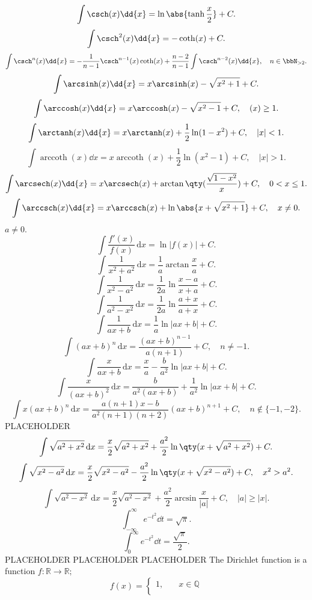 \documentclass[a4paper,12pt]{report}
\begin{document}
\begin{itemize}
\begin{itemize}
\[\int\csch(x)\dd{x}=\ln\abs{\tanh\frac{x}{2}}+C.\]
\[\int\csch^2(x)\dd{x}=-\coth(x)+C.\]
\[\int\csch^n(x)\dd{x}=-\frac{1}{n-1}\csch^{n-1}(x)\coth(x)+\frac{n-2}{n-1}\int\csch^{n-2}(x)\dd{x},\quad n\in\bbN_{>2}.\]
\[\int\arcsinh(x)\dd{x}=x\arcsinh(x)-\sqrt{x^2+1}+C.\]
\[\int\arccosh(x)\dd{x}=x\arccosh(x)-\sqrt{x^2-1}+C,\quad(x)\geq 1.\]
\[\int\arctanh(x)\dd{x}=x\arctanh(x)+\frac{1}{2}\ln(1-x^2)+C,\quad|x|<1.\]
\[\int\operatorname{arccoth}(x)\dd{x}=x\operatorname{arccoth}(x)+\frac{1}{2}\ln(x^2-1)+C,\quad|x|>1.\]
\[\int\arcsech(x)\dd{x}=x\arcsech(x)+\arctan\qty(\frac{\sqrt{1-x^2}}{x})+C,\quad 0<x\leq 1.\]
\[\int\arccsch(x)\dd{x}=x\arccsch(x)+\ln\abs{x+\sqrt{x^2+1}}+C,\quad x\neq 0.\]
$a\neq 0$.
\[\int\frac{f'(x)}{f(x)}\,\mathrm{d}x=\ln|f(x)|+C.\]
\[\int\frac{1}{x^2+a^2}\,\mathrm{d}x=\frac{1}{a}\arctan\frac{x}{a}+C.\]
\[\int\frac{1}{x^2-a^2}\,\mathrm{d}x=\frac{1}{2a}\ln\frac{x-a}{x+a}+C.\]
\[\int\frac{1}{a^2-x^2}\,\mathrm{d}x=\frac{1}{2a}\ln\frac{a+x}{a+x}+C.\]
\[\int\frac{1}{ax+b}\,\mathrm{d}x=\frac{1}{a}\ln|ax+b|+C.\]
\[\int(ax+b)^n\,\mathrm{d}x=\frac{(ax+b)^{n-1}}{a(n+1)}+C,\quad n\neq -1.\]
\[\int\frac{x}{ax+b}\,\mathrm{d}x=\frac{x}{a}-\frac{b}{a^2}\ln|ax+b|+C.\]
\[\int\frac{x}{(ax+b)^2}\,\mathrm{d}x=\frac{b}{a^2(ax+b)}+\frac{1}{a^2}\ln|ax+b|+C.\]
\[\int x(ax+b)^n\,\mathrm{d}x=\frac{a(n+1)x-b}{a^2(n+1)(n+2)}(ax+b)^{n+1}+C,\quad n\notin\{-1,-2\}.\]
PLACEHOLDER
\[\int\sqrt{a^2+x^2}\,\mathrm{d}x=\frac{x}{2}\sqrt{a^2+x^2}+\frac{a^2}{2}\ln\qty(x+\sqrt{a^2+x^2})+C.\]
\[\int\sqrt{x^2-a^2}\,\mathrm{d}x=\frac{x}{2}\sqrt{x^2-a^2}-\frac{a^2}{2}\ln\qty(x+\sqrt{x^2-a^2})+C,\quad x^2>a^2.\]
\[\int\sqrt{a^2-x^2}\,\mathrm{d}x=\frac{x}{2}\sqrt{a^2-x^2}+\frac{a^2}{2}\arcsin\frac{x}{|a|}+C,\quad|a|\geq|x|.\]
\[\int_{-\infty}^{\infty}e^{-t^2}\dd{t}=\sqrt{\pi}.\]
\[\int_0^{\infty}e^{-t^2}\dd{t}=\frac{\sqrt{\pi}}{2}.\]
PLACEHOLDER
PLACEHOLDER
PLACEHOLDER
The Dirichlet function is a function $f\colon\mathbb{R}\to\mathbb{R};$
\[f(x)=\begin{cases}1,\quad & x\in\mathbb{Q}\\

\end{cases}\]
\end{itemize}
\end{itemize}
\end{document}
